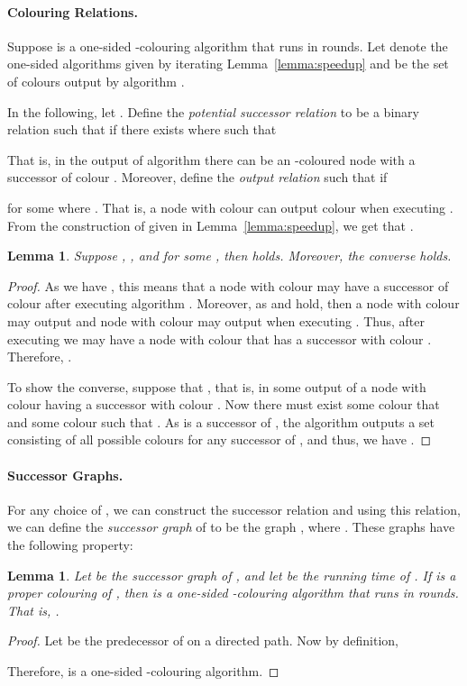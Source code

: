 \documentclass[a4paper,11pt]{article}
\newtheorem{lemma}[theorem]{Lemma}
\theoremstyle{remark}
\begin{document}
\paragraph{Colouring Relations.}

Suppose  is a one-sided -colouring algorithm that runs in  rounds. Let  denote the one-sided algorithms given by iterating Lemma~\ref{lemma:speedup} and  be the set of colours output by algorithm .

In the following, let . Define the \emph{potential successor relation}  to be a binary relation such that  if there exists  where  such that 

That is, in the output of algorithm  there can be an -coloured node with a successor of colour . Moreover, define the \emph{output relation}  such that  if 

for some  where . That is, a node with colour  can output colour  when executing . From the construction of  given in Lemma~\ref{lemma:speedup}, we get that .

\begin{lemma}
 Suppose , , and  for some , then  holds. Moreover, the converse holds.
\end{lemma}
\begin{proof}
 As we have , this means that a node with colour  may have a successor of colour  after executing algorithm . Moreover, as  and  hold, then a node with colour  may output  and node with colour  may output  when executing . Thus, after executing  we may have a node with colour  that has a successor with colour . Therefore, .

 To show the converse, suppose that , that is, in some output of  a node  with colour  having a successor  with colour . Now there must exist some colour  that  and some colour  such that . As  is a successor of , the algorithm  outputs a set  consisting of all possible colours for any successor of , and thus, we have .
\end{proof}

\paragraph{Successor Graphs.} For any choice of , we can construct the successor relation  and using this relation, we can define the \emph{successor graph} of  to be the graph , where . These graphs have the following property:
\begin{lemma} \label{lemma:chromatic}
 Let  be the successor graph of , and let  be the running time of . If  is a proper colouring of , then  is a one-sided -colouring algorithm that runs in  rounds. That is, .
\end{lemma}
\begin{proof}
 Let  be the predecessor of  on a directed path. Now by definition, 

Therefore,  is a one-sided -colouring algorithm.
 \end{proof}
\end{document}
